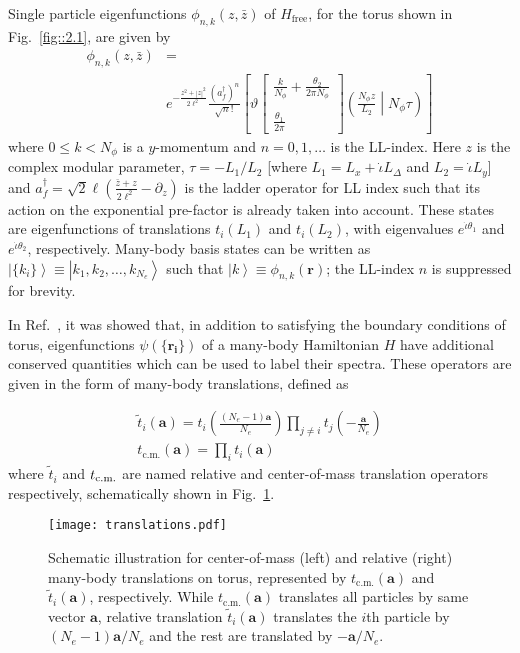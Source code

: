 \documentclass[prb,aps,epsfig,longbibliography,twocolumn]{revtex4-1}
\newcommand{\ket}[1]{\left|#1\right\rangle }
\newcommand{\bsym}[1]{\boldsymbol{#1}}
\newcommand{\rbkt}[1]{\left( #1\right)}
\newcommand{\sbkt}[1]{\left[ #1\right]}
\newcommand{\spmtoi}[2]{t_{#1}\rbkt{\bsym{#2}}}
\newcommand{\tcm}[1]{t_{\text{c.m.}} \rbkt{\bsym{#1}}}
\newcommand{\trel}[2]{\tilde{t}_{#1}\rbkt{\bsym{#2}}}
\newcommand{\np}{N_{\phi}}
\newcommand{\jbkt}[2]{\left( #1 \middle| #2\right)}
\newcommand{\rtheta}[4]{\vartheta \sbkt{ \substack{{#1} \\ \\{#2}}}	\jbkt{#3}{#4}}
\newcommand{\iiota}{\dot{\iota}}
\begin{document}
Single particle eigenfunctions $\phi_{n,k}(z,\bar{z})$ of $H_{\text{free}}$, for the torus shown in Fig.~\ref{fig::2.1}, are given by
\begin{align}
\phi_{n,k}(z,\bar{z})&= \nonumber\\
&e^{-\frac{z^2+|z|^2}{2\ell^{2}}}\frac{(a_f^{\dagger})^{n}}{\sqrt{n}!}\sbkt{\rtheta{\frac{k}{\np}+\frac{\theta_2}{2\pi \np}}{\frac{\theta_{1}}{2\pi}}{\frac{\np z}{L_2}}{\np \tau}} \label{SingleParticleTorus}
\end{align}
where $0\leq k <\np$ is a $y$-momentum and $n=0,1,\dots$ is the LL-index. Here $z$ is the complex modular parameter, $\tau=-L_1/L_2 $  [where $L_1=L_x + \iiota L_{\Delta}$ and $L_2=\iiota L_y$] and $a_f^{\dagger} = \sqrt{2}\ell\rbkt{\frac{\bar{z}+z}{2\ell^2}-\partial_z} $ is the ladder operator for LL index such that its action on the exponential pre-factor is already taken into account. These states are eigenfunctions of translations $t_i(L_1)$ and $t_i(L_2)$, with eigenvalues $e^{\iiota \theta_1}$ and $e^{\iiota \theta_2}$, respectively. Many-body basis states can be written as $\ket{\{k_i\}}\equiv \ket{k_1,k_2,\dots,k_{N_e}}$ such that $ \ket{k} \equiv \phi_{n,k}(\bsym{r})$; the LL-index $n$ is suppressed for brevity. 

In Ref.~, it was  showed that, in addition to satisfying the boundary conditions of torus, eigenfunctions $\psi\rbkt{\{\bsym{r_i}\}}$ of a many-body Hamiltonian $H$ have additional conserved quantities which can be used to  label their spectra. These operators are given in the form of many-body translations, defined as

\begin{gather} \label{eq::2.4}
\trel{i}{a}={t}_{i}\rbkt{\frac{(N_e-1)\bsym{a}}{N_e}} \prod_{j\neq i} {t}_{j}\rbkt{-\frac{\bsym{a}}{N_e}}\nonumber \\
\tcm{a}= \prod_{i} \spmtoi{i}{a} 
\end{gather}
where ${\tilde{t}}_{i}$ and ${t}_{\rm c.m.}$ are named relative and center-of-mass translation operators respectively, schematically shown in Fig.~\ref{manyBodyTranslations}.

\begin{figure}
	\texttt{[image: translations.pdf]}
	\caption{Schematic illustration for center-of-mass (left) and relative (right) many-body translations on torus, represented by $\tcm{a}$ and $\trel{i}{a}$, respectively. While $\tcm{a}$ translates all particles by same vector $\bsym{a}$, relative translation $\trel{i}{a}$ translates the $i$th particle by ${(N_e-1)\bsym{a}}/{N_e}$ and the rest are translated by $-{\bsym{a}}/{N_e}$.}
	\label{manyBodyTranslations}
\end{figure}
\end{document}
